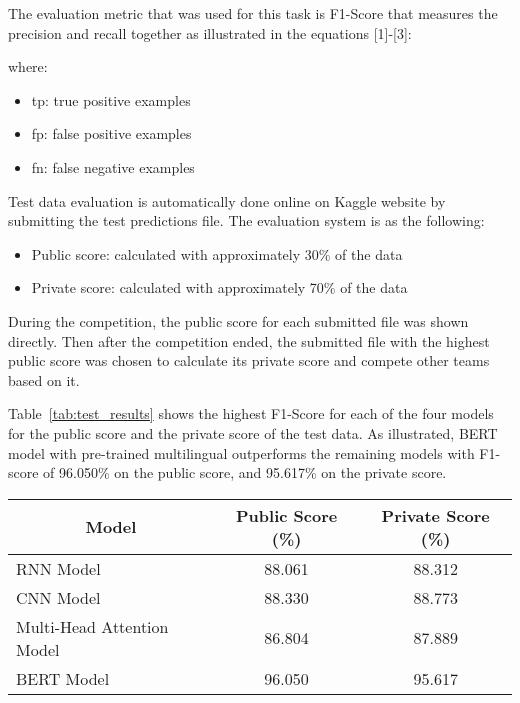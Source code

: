 \documentclass[11pt,a4paper]{article}
\begin{document}
The evaluation metric that was used for this task is F1-Score that measures the precision  and recall  together as illustrated in the  equations [1]-[3]:








where:
\begin{itemize}
    \item tp: true positive examples
    \item fp: false positive examples
    \item  fn: false negative examples
\end{itemize}

\vspace{0.2in}

Test data evaluation is automatically done online on Kaggle website by submitting the test predictions file. The evaluation system is as the following:
\begin{itemize}
    \item Public score: calculated with approximately  30\% of the data
    \item Private score: calculated with approximately 70\% of the data
\end{itemize}


During the competition, the public score for each submitted file was shown directly. Then after the competition ended, the submitted file with the highest public score was chosen to calculate its private score and compete other teams based on it.

Table~\ref{tab:test_results} shows the highest F1-Score for each of the four models for the public score and the private score of the test data. As illustrated, BERT model with pre-trained multilingual outperforms the remaining models with F1-score of 96.050\% on the public score, and 95.617\% on the private score.

\begin{table*}
\centering
\begin{tabular}{|l|c|c|}
\hline
\multicolumn{1}{|c|}{Model}   & \multicolumn{1}{c|}{ Public Score (\%)}  & \multicolumn{1}{c|}{ Private Score (\%)}   \\ \hline
 
 RNN Model    &    88.061      &  88.312  \\ \hline
 CNN Model    &    88.330     &  88.773  \\ \hline
 Multi-Head Attention Model    &  86.804 &  87.889 \\ \hline
 BERT Model  &   96.050 & 95.617  \\ \hline
   
\end{tabular}
\caption{Results of 30\% of the test data}
\label{tab:test_results}
\end{table*}
\end{document}
